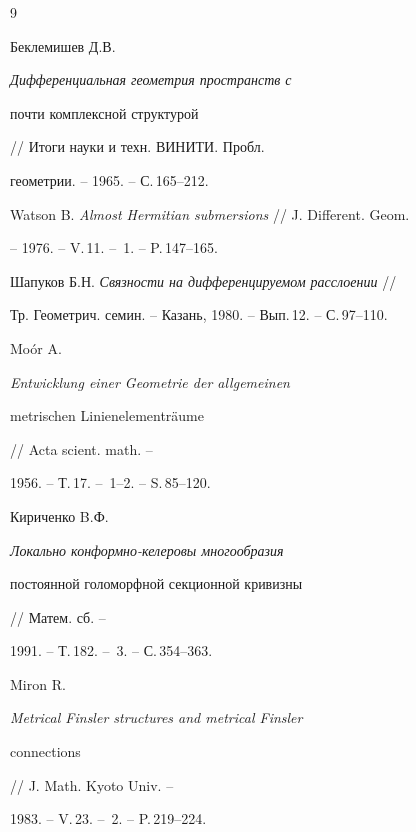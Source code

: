 \begin{thebibliography}{9} 


 




Беклемишев Д.В. {\em Дифференциальная геометрия пространств с 


почти комплексной структурой} // Итоги науки и техн. ВИНИТИ. Пробл. 


геометрии. -- 1965. -- С.\,165--212. 




Watson B. {\em Almost Hermitian submersions} // J. Different. Geom. 


-- 1976. -- V.\,11. -- \No\,1. -- P.\,147--165. 




Шапуков Б.Н. {\em Связности на дифференцируемом расслоении} //  


Тр. Геометрич. семин. -- Казань, 1980. -- Вып.\,12. -- С.\,97--110. 




Mo\'o{}r A. {\em Entwicklung einer Geometrie der allgemeinen 


metrischen Linienelementr\"a{}ume} // Acta scient. math. -- 


1956. -- Т.\,17. -- \No\,1--2. -- S.\,85--120. 




Кириченко B.Ф. {\em Локально конформно-келеровы многообразия 


постоянной голоморфной секционной кривизны} // Матем. сб. -- 


1991. -- Т.\,182. -- \No\,3. -- С.\,354--363. 




Miron R. {\em Metrical Finsler structures and metrical Finsler 


connections} // J. Math. Kyoto Univ. -- 


1983. -- V.\,23. -- \No\,2. -- P.\,219--224. 


 


\end{thebibliography} 


 


\vskip 2cm 


 






 


\label{end} 


 


 


